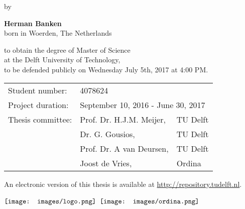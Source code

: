 \begin{minipage}[t][0.99\textheight]{0.99\textwidth}
    \begin{center}
        \vspace*{1cm}
        
        \Huge
        \textbf{\thesistitle}
        
        \large
		\vspace{0.5cm}
		by
        \vspace{0.5cm}
        
        \Large
        \textbf{Herman Banken}\\
		\normalsize
        born in Woerden, The Netherlands
        
        \vspace{1cm}
        \vfill

		to obtain the degree of Master of Science\\
		at the Delft University of Technology,\\
		to be defended publicly on Wednesday July 5th, 2017 at 4:00 PM.
        
        \vspace{0.8cm}
                
		\begin{tabular}{l l l}
		Student number:     & \multicolumn{2}{l}{4078624} \\
		Project duration:   & \multicolumn{2}{l}{September 10, 2016 - June 30, 2017} \\
		Thesis committee:   & Prof. Dr. H.J.M. Meijer, 	& TU Delft \\
    						& Dr. G. Gousios,           & TU Delft \\
    						& Prof. Dr. A van Deursen,  & TU Delft \\
    						& Joost de Vries,           & Ordina
		\end{tabular}

        \vspace{0.8cm}

		An electronic version of this thesis is available at \url{http://repository.tudelft.nl}.

\begin{minipage}{6in}
  \centering
  $\vcenter{\hbox{\texttt{[image: images/logo.png]}}}$
  \hspace*{.2in}
  $\vcenter{\hbox{\texttt{[image: images/ordina.png]}}}$
\end{minipage}
        
    \end{center}
\end{minipage}